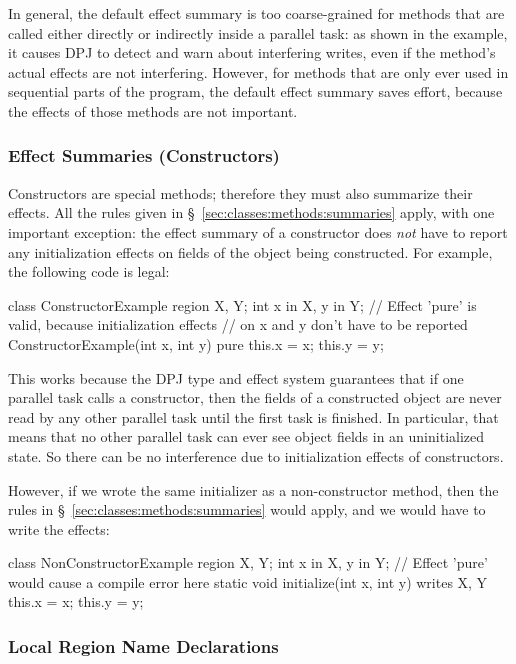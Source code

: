 In general, the default effect summary is too coarse-grained for
methods that are called either directly or indirectly inside a
parallel task: as shown in the example, it causes DPJ to detect and
warn about interfering writes, even if the method's actual effects are
not interfering.  However, for methods that are only ever used in
sequential parts of the program, the default effect summary saves
effort, because the effects of those methods are not important.

\subsubsection{Effect Summaries (Constructors)%
\label{sec:classes:methods:summaries-constructor}}

Constructors are special methods; therefore they must also summarize
their effects.  All the rules given in
\S~\ref{sec:classes:methods:summaries} apply, with one important
exception: the effect summary of a constructor does \emph{not} have to
report any initialization effects on fields of the object being
constructed.  For example, the following code is legal:
%
\begin{dpjlisting}
class ConstructorExample {
  region X, Y;
  int x in X, y in Y;
  // Effect 'pure' is valid, because initialization effects
  // on x and y don't have to be reported
  ConstructorExample(int x, int y) 
    pure 
  {
    this.x = x;
    this.y = y;
  }
}
\end{dpjlisting}
%
This works because the DPJ type and effect system guarantees that if
one parallel task calls a constructor, then the fields of a
constructed object are never read by any other parallel task until the
first task is finished.  In particular, that means that no other
parallel task can ever see object fields in an uninitialized state.
So there can be no interference due to initialization effects of
constructors.

However, if we wrote the same initializer as a non-constructor method,
then the rules in \S~\ref{sec:classes:methods:summaries} would apply,
and we would have to write the effects:
%
\begin{dpjlisting}
class NonConstructorExample {
  region X, Y;
  int x in X, y in Y;
  // Effect 'pure' would cause a compile error here
  static void initialize(int x, int y) writes X, Y {
    this.x = x;
    this.y = y;
  }
}
\end{dpjlisting}

\subsubsection{Local Region Name Declarations%
\label{sec:classes:methods:local-regions}}

